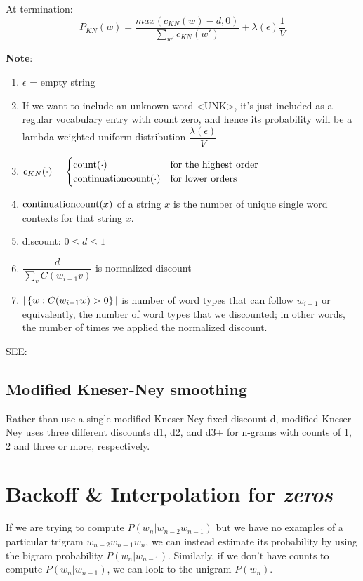 At termination:
\[
    P_{KN}(w) = \displaystyle\dfrac{max(c_{KN}(w)-d,0)}{\sum_{w'} c_{KN}(w')} + \lambda(\epsilon)\displaystyle\dfrac{1}{V}
\]

\textbf{Note}:

\begin{enumerate}[itemsep=0.1cm]
    \item $\epsilon$ = empty string
    \item If we want to include an unknown word <UNK>, it’s just included as a regular vocabulary entry with count zero, and hence its probability will be a lambda-weighted uniform distribution \(\displaystyle\dfrac{\lambda(\epsilon)}{V}\)
    \item \(c_{KN}(\cdot) = \begin{cases}
        \operatorname{count}(\cdot) & \text{for the highest order} \\
        \operatorname{continuationcount}(\cdot) & \text{for lower orders}
    \end{cases}\)
    \item $\operatorname{continuationcount}(x)$ of a string $x$ is the number of unique single word contexts for that string $x$.
    \item discount: $0 \leq d \leq 1$ 
    \item \(\displaystyle\dfrac{d}{\sum_v C(w_{i-1}v)}\) is normalized discount
    \item \(|\left\{w : C(w_{i-1}w) > 0\right\}|\) is number of word types that can follow $w_{i-1}$ or equivalently, the number of word types that we discounted; in other words, the number of times we applied the normalized discount.
\end{enumerate}

\vspace{0.2cm}

SEE: 

\subsection{Modified Kneser-Ney smoothing}
Rather than use a single modified
Kneser-Ney fixed discount d, modified Kneser-Ney uses three different discounts d1, d2, and d3+ for n-grams with counts of 1, 2 and three or more, respectively.

\section{Backoff \& Interpolation for \textit{zeros} \cite{nlp-1}}
If we are trying to compute $P(w_n|w_{n-2}w_{n-1})$ but we have no examples of a particular trigram $w_{n-2}w_{n-1}w_n$, we can instead estimate its probability by using the bigram probability $P(w_n|w_{n-1})$. Similarly, if we don’t have counts to compute $P(w_n|w_{n-1})$, we can look to the unigram $P(w_n)$.

